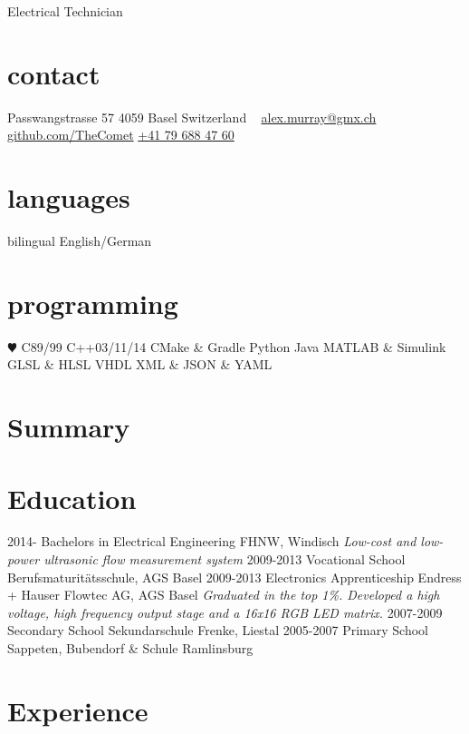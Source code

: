 \documentclass[]{friggeri-cv}
\begin{document}
       {Electrical Technician}


\begin{aside}
  \section{contact}
    Passwangstrasse 57
    4059 Basel
    Switzerland
    ~
    \href{mailto:alex.murray@gmx.ch}{alex.murray@gmx.ch}
    \href{https://github.com/TheComet}{github.com/TheComet}
    \href{tel:41796884760}{+41 79 688 47 60}
  \section{languages}
    bilingual English/German
  \section{programming}
    {\color{red} $\varheartsuit$} C89/99
    C++03/11/14
    CMake \& Gradle
    Python
    Java
    MATLAB \& Simulink
    GLSL \& HLSL
    VHDL
    XML \& JSON \& YAML
\end{aside}

\section{Summary}



\section{Education}

\begin{entrylist}
  \entry
    {2014-}
    {Bachelors in Electrical Engineering}
    {FHNW, Windisch}
    {\emph{Low-cost and low-power ultrasonic flow measurement system}}
  \entry
    {2009-2013}
    {Vocational School}
    {Berufsmaturit\"atsschule, AGS Basel}
    {}
  \entry
    {2009-2013}
    {Electronics Apprenticeship}
    {Endress + Hauser Flowtec AG, AGS Basel}
    {\emph{Graduated in the top 1\%. Developed a high voltage, high frequency output stage and a 16x16 RGB LED matrix.}}
  \entry
    {2007-2009}
    {Secondary School}
    {Sekundarschule Frenke, Liestal}
    {}
  \entry
    {2005-2007}
    {Primary School}
    {Sappeten, Bubendorf \& Schule Ramlinsburg}
    {}
\end{entrylist}

\section{Experience}
\end{document}
